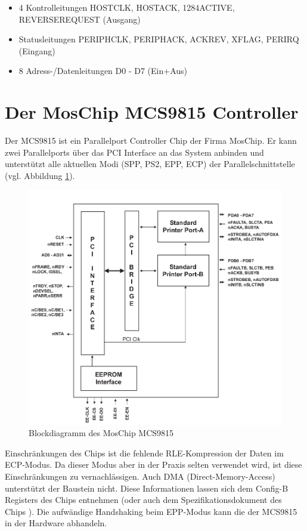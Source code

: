 \documentclass[a4paper,11pt]{article}
\begin{document}
\begin{itemize}
\item 4 Kontrolleitungen HOSTCLK, HOSTACK, 1284ACTIVE, REVERSEREQUEST (Ausgang)
\item Statusleitungen PERIPHCLK, PERIPHACK, ACKREV, XFLAG, PERIRQ (Eingang)
\item 8 Adress-/Datenleitungen D0 - D7 (Ein+Aus) \end{itemize}


\section{Der MosChip MCS9815 Controller}

Der MCS9815 ist ein Parallelport Controller Chip der Firma MosChip. Er kann
zwei Parallelports über das PCI Interface an das System anbinden und unterstützt alle
aktuellen Modi (SPP, PS2, EPP, ECP) der Parallelschnittstelle (vgl. Abbildung \ref{fig:blockdiagramm_mcs9815}).

\begin{figure}[h!]
 \centering
 \includegraphics[bb=0 0 724 671,scale=0.5]{./pics/mcs9815_block_diagram.png}
 \caption{Blockdiagramm des MosChip MCS9815}
 \label{fig:blockdiagramm_mcs9815}
\end{figure}

Einschränkungen des Chips ist die fehlende RLE-Kompression der Daten im ECP-Modus. Da dieser Modus aber
in der Praxis selten verwendet wird, ist diese Einschränkungen zu vernachlässigen.
Auch DMA (Direct-Memory-Access) unterstützt der Baustein nicht. Diese Informationen lassen sich dem Config-B Registers des
Chips entnehmen (oder auch dem Spezifikationsdokument des Chips \cite{net:3}).
Die aufwändige Handshaking beim EPP-Modus kann die der MCS9815 in der Hardware abhandeln.
\end{document}
